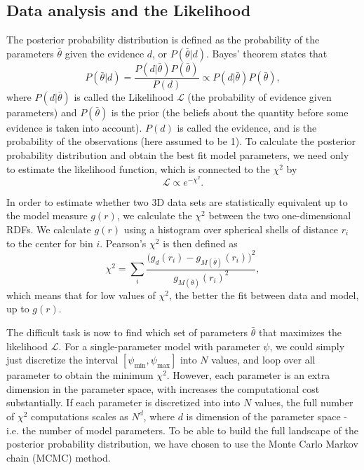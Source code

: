 \documentclass[aps,pre,twocolumn,letterpaper,floatfix,showpacs]{revtex4}
\begin{document}

\subsection{Data analysis and the Likelihood}

The posterior probability distribution is defined as the probability of the parameters
$\bar \theta$ given the evidence $d$, or $P(\bar \theta | d)$. Bayes' theorem states that 
\begin{equation}
P(\bar \theta | d) = \frac{P(d | \bar \theta)P(\bar \theta)}{P(d)} \propto P(d | \bar \theta)P(\bar \theta),
\end{equation}
where $P(d | \bar \theta)$ is called the Likelihood $\mathcal L$ (the probability of
evidence given parameters) and $P(\bar \theta)$ is the prior (the beliefs about the
quantity before some evidence is taken into account). $P(d)$ is called the evidence,
and is the probability of the observations (here assumed to be 1). 
To calculate the posterior probability distribution and obtain the best fit model parameters, we need only
to estimate the likelihood function, which is connected to the $\chi^2$ by 
\begin{equation}
\mathcal L \propto e^{-\chi^2}.
\end{equation}

In order to estimate whether two 3D data sets are statistically equivalent up to
the model measure $g(r)$, we calculate the $\chi^2$ between the two one-dimensional
RDFs. We calculate $g(r)$ using a histogram over spherical shells of distance $r_i$ to the center for bin $i$. Pearson's $\chi^2$ is then defined as 
\begin{equation}
  \chi^2 = \sum_{i} \frac{ \Big(g_d(r_i) - g_{M(\bar \theta)}(r_i) \Big)^2}{g_{M(\bar \theta)}(r_i)^2},
\end{equation}
which means that for low values of $\chi^2$, the better the fit between data and model, up to $g(r)$.

The difficult task is now to find which set of parameters $\bar\theta$ that maximizes the likelihood $\mathcal L$.
For a single-parameter model with parameter $\psi$, we could simply just discretize the interval $[\psi_\text{min}, \psi_\text{max}]$ into $N$ values,
and loop over all parameter to obtain the minimum $\chi^2$.
However, each parameter is an extra dimension in the parameter space, with increases the computational cost substantially.
If each parameter is discretized into into $N$ values, the full number of $\chi^2$ computations
scales as $N^d$, where $d$ is dimension of the parameter space - i.e. the number of model parameters. To be able to build
the full landscape of the posterior probability distribution, we have chosen to use the Monte Carlo Markov chain (MCMC) method.
\end{document}
